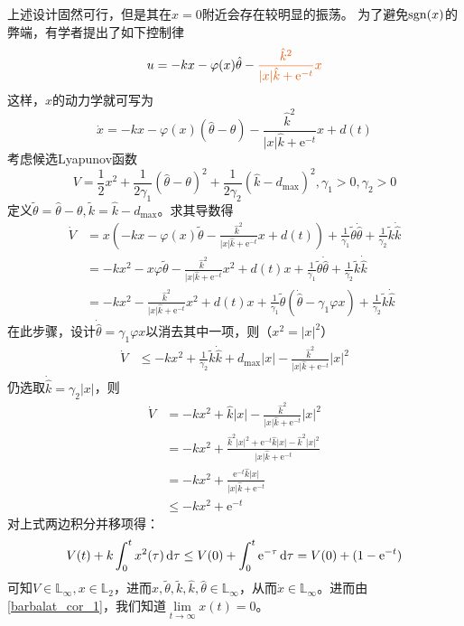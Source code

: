 上述设计固然可行，但是其在$x=0$附近会存在较明显的振荡。
为了避免$\operatorname{sgn}(x)$的弊端，有学者提出了如下控制律
\[u=-kx-\varphi(x)\hat{\theta}-\textcolor{second}{\frac{\hat{k}^2}{|x|\hat{k}+\mathrm{e}^{-t}}x}\]
这样，$x$的动力学就可写为
\[\dot{x}=-kx-\varphi(x)(\hat{\theta}-\theta)-\frac{\hat{k}^2}{|x|\hat{k}+\mathrm{e}^{-t}}x+d(t)\]
考虑候选Lyapunov函数
\[V=\frac{1}{2}x^2+\frac{1}{2\gamma_1}(\hat{\theta}-\theta)^2+\frac{1}{2\gamma_2}(\hat{k}-d_{\max})^2,\gamma_1>0,\gamma_2>0\]
定义$\tilde{\theta}=\hat{\theta}-\theta,\tilde{k}=\hat{k}-d_{\max}$。求其导数得
\begin{align*}
    \dot{V}&=x\left(-kx-\varphi(x)\tilde{\theta}-\frac{\hat{k}^2}{|x|\hat{k}+\mathrm{e}^{-t}}x+d(t)\right)+\frac{1}{\gamma_1}\tilde{\theta}\dot{\hat{\theta}}+\frac{1}{\gamma_2}\tilde{k}\dot{\hat{k}}\\
    &=-kx^2-x\varphi\tilde{\theta}-\frac{\hat{k}^2}{|x|\hat{k}+\mathrm{e}^{-t}}x^2+d(t)x+\frac{1}{\gamma_1}\tilde{\theta}\dot{\hat{\theta}}+\frac{1}{\gamma_2}\tilde{k}\dot{\hat{k}}\\
    &=-kx^2-\frac{\hat{k}^2}{|x|\hat{k}+\mathrm{e}^{-t}}x^2+d(t)x+\frac{1}{\gamma_1}\tilde{\theta}(\dot{\hat{\theta}}-\gamma_1\varphi x)+\frac{1}{\gamma_2}\tilde{k}\dot{\hat{k}}
\end{align*}
在此步骤，设计$\dot{\hat{\theta}}=\gamma_1\varphi x$以消去其中一项，则（$x^2=|x|^2$）
\begin{align*}
    \dot{V}&\leq -kx^2+\frac{1}{\gamma_2}\tilde{k}\dot{\hat{k}}+d_{\max}|x|-\frac{\hat{k}^2}{|x|\hat{k}+\mathrm{e}^{-t}}|x|^2
\end{align*}
仍选取$\dot{\hat{k}}=\gamma_2 |x|$，则
\begin{align*}
   \dot{V} &=-kx^2+{\hat{k}}|x|-\frac{\hat{k}^2}{|x|\hat{k}+\mathrm{e}^{-t}}|x|^2\\
    &=-kx^2+\frac{\hat{k}^2|x|^2+\mathrm{e}^{-t}\hat{k}|x|-\hat{k}^2|x|^2}{|x|\hat{k}+\mathrm{e}^{-t}}\\
    &=-kx^2+\frac{\mathrm{e}^{-t}\hat{k}|x|}{|x|\hat{k}+\mathrm{e}^{-t}}\\
    &\leq -kx^2+\mathrm{e}^{-t}
\end{align*}
对上式两边积分并移项得：
\[V(t)+k\int_{0}^{t} x^2(\tau)\mathop{}\!\mathrm{d}\tau\le V(0)+\int_{0}^{t} \mathrm{e}^{-\tau}\mathop{}\!\mathrm{d}\tau=V(0)+(1-\mathrm{e}^{-t})\]
可知$V\in\mathbb{L}_\infty,x\in\mathbb{L}_2$，进而$x,\tilde{\theta},\tilde{k},\hat{k},\hat{\theta}\in\mathbb{L}_\infty$，从而$\dot{x}\in\mathbb{L}_\infty$。进而由 \ref{barbalat_cor_1}，我们知道$\lim\limits_{t\to\infty}x(t)=0$。